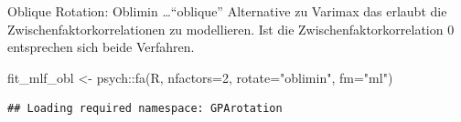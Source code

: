 \documentclass[
  ignorenonframetext,
]{beamer}
\newenvironment{Shaded}{\begin{snugshade}}{\end{snugshade}}
\newcommand{\AttributeTok}[1]{\textcolor[rgb]{0.77,0.63,0.00}{#1}}
\newcommand{\DecValTok}[1]{\textcolor[rgb]{0.00,0.00,0.81}{#1}}
\newcommand{\FunctionTok}[1]{\textcolor[rgb]{0.00,0.00,0.00}{#1}}
\newcommand{\NormalTok}[1]{#1}
\newcommand{\OtherTok}[1]{\textcolor[rgb]{0.56,0.35,0.01}{#1}}
\newcommand{\SpecialCharTok}[1]{\textcolor[rgb]{0.00,0.00,0.00}{#1}}
\newcommand{\StringTok}[1]{\textcolor[rgb]{0.31,0.60,0.02}{#1}}
\begin{document}
\begin{frame}[fragile]{Oblique Rotation: Oblimin}
\protect\hypertarget{oblique-rotation-oblimin}{}
\ldots{}``oblique'' Alternative zu Varimax das erlaubt die
Zwischenfaktorkorrelationen zu modellieren. Ist die
Zwischenfaktorkorrelation 0 entsprechen sich beide Verfahren.

\begin{Shaded}
\begin{Highlighting}[]
\NormalTok{fit\_mlf\_obl }\OtherTok{\textless{}{-}}\NormalTok{ psych}\SpecialCharTok{::}\FunctionTok{fa}\NormalTok{(R, }\AttributeTok{nfactors=}\DecValTok{2}\NormalTok{, }\AttributeTok{rotate=}\StringTok{"oblimin"}\NormalTok{, }\AttributeTok{fm=}\StringTok{"ml"}\NormalTok{)}
\end{Highlighting}
\end{Shaded}

\begin{verbatim}
## Loading required namespace: GPArotation
\end{verbatim}


\end{frame}
\end{document}
